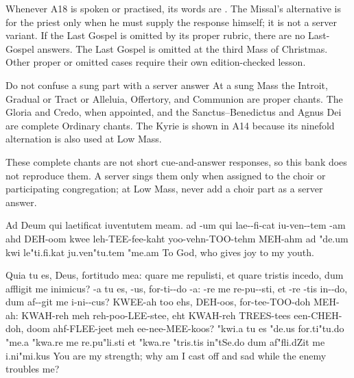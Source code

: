 {Whenever A18 is spoken or practised, its words are
.  The Missal's alternative
 is for the priest only when he must supply the
response himself; it is not a server variant.  If the Last Gospel is omitted
by its proper rubric, there are no Last-Gospel answers. The Last Gospel is
omitted at the third Mass of Christmas. Other proper or omitted cases require
their own edition-checked lesson.

\begin{coachbox}{Do not confuse a sung part with a server answer}
At a sung Mass the Introit, Gradual or Tract or Alleluia, Offertory, and
Communion are proper chants.  The Gloria and Credo, when appointed, and the
Sanctus--Benedictus and Agnus Dei are complete Ordinary chants.  The Kyrie is
shown in A14 because its ninefold alternation is also used at Low Mass.

These complete chants are not short cue-and-answer responses, so this bank
does not reproduce them. A server sings them only when assigned to the choir
or participating congregation; at Low Mass, never add a choir part as a
server answer.
\end{coachbox}
}
\fi


  {Ad Deum qui laetificat iuventutem meam.}
  {ad -um qui lae--fi-cat iu-ven--tem -am}
  {ahd DEH-oom kwee leh-TEE-fee-kaht yoo-vehn-TOO-tehm MEH-ahm}
  {ad "de.um kwi le"ti.fi.kat ju.ven"tu.tem "me.am}
  {To God, who gives joy to my youth.}

  {Quia tu es, Deus, fortitudo mea: quare me repulisti, et quare tristis incedo, dum affligit me inimicus?}
  {-a tu es, -us, for-ti--do -a: -re me re-pu--sti, et -re -tis in--do, dum af--git me i-ni--cus?}
  {KWEE-ah too ehs, DEH-oos, for-tee-TOO-doh MEH-ah: KWAH-reh meh reh-poo-LEE-stee, eht KWAH-reh TREES-tees een-CHEH-doh, doom ahf-FLEE-jeet meh ee-nee-MEE-koos?}
  {"kwi.a tu es "de.us for.ti"tu.do "me.a "kwa.re me re.pu"li.sti et "kwa.re "tris.tis in"tSe.do dum af"fli.dZit me i.ni"mi.kus}
  {You are my strength; why am I cast off and sad while the enemy troubles me?}

